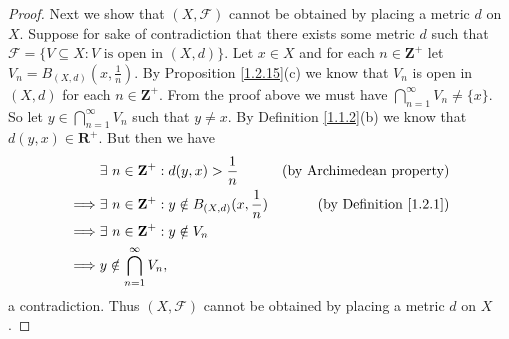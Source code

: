 \begin{proof}
    Next we show that \((X, \mathcal{F})\) cannot be obtained by placing a metric \(d\) on \(X\).
    Suppose for sake of contradiction that there exists some metric \(d\) such that \(\mathcal{F} = \{V \subseteq X : V \text{ is open in } (X, d)\}\).
    Let \(x \in X\) and for each \(n \in \mathbf{Z}^+\) let \(V_n = B_{(X, d)}(x, \frac{1}{n})\).
    By Proposition \ref{1.2.15}(c) we know that \(V_n\) is open in \((X, d)\) for each \(n \in \mathbf{Z}^+\).
    From the proof above we must have \(\bigcap_{n = 1}^\infty V_n \neq \{x\}\).
    So let \(y \in \bigcap_{n = 1}^\infty V_n\) such that \(y \neq x\).
    By Definition \ref{1.1.2}(b) we know that \(d(y, x) \in \mathbf{R}^+\).
    But then we have
    \begin{align*}
                 & \exists\ n \in \mathbf{Z}^+ : d(y, x) > \frac{1}{n}               & \text{(by Archimedean property)}   \\
        \implies & \exists\ n \in \mathbf{Z}^+ : y \notin B_{(X, d)}(x, \frac{1}{n}) & \text{(by Definition \ref{1.2.1})} \\
        \implies & \exists\ n \in \mathbf{Z}^+ : y \notin V_n                                                             \\
        \implies & y \notin \bigcap_{n = 1}^\infty V_n,
    \end{align*}
    a contradiction.
    Thus \((X, \mathcal{F})\) cannot be obtained by placing a metric \(d\) on \(X\).


\end{proof}
